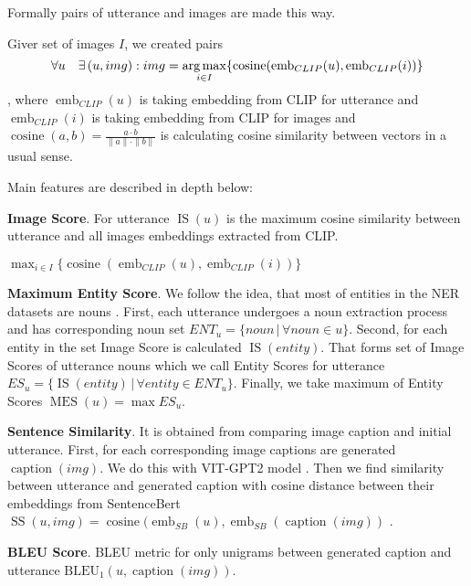 Formally pairs of utterance and images are made this way.

Giver set of images $I$, we created pairs $$\forall u \quad \exists \, (u,img): img = \displaystyle\operatorname*{arg\,max}_{i \in I} \{\operatorname{cosine}(\operatorname{emb}_{CLIP}(u), \operatorname{emb}_{CLIP}(i))\}$$, where $\operatorname{emb}_{CLIP}(u)$ is taking embedding from CLIP for utterance and $\operatorname{emb}_{CLIP}(i)$ is taking embedding from CLIP for images and $\operatorname{cosine}(a,b) = \frac{a \cdot b}{ \| a \| \cdot \| b\|}$ is calculating cosine similarity between vectors in a usual sense.

Main features are described in depth below:

\textbf{Image Score}. For utterance $\operatorname{IS}(u)$ is the maximum cosine similarity between utterance and all images embeddings extracted from CLIP. 

$\displaystyle\max_{i \in I} \{\operatorname{cosine}(\operatorname{emb}_{CLIP}(u), \operatorname{emb}_{CLIP}(i))\}$

\smallskip

\textbf{Maximum Entity Score}. We follow the idea, that most of entities in the NER datasets are nouns \cite{Noun-based}. First, each utterance undergoes a noun extraction process and has corresponding noun set $ENT_u = \{noun \, | \, \forall noun \in u \}$.  Second, for each entity in the set Image Score is calculated $\operatorname{IS}(entity)$. That forms set of Image Scores of utterance nouns which we call Entity Scores for utterance $ES_u = \{\operatorname{IS}(entity) \, | \, \forall entity \in ENT_u \}$. Finally, we take maximum of Entity Scores $\operatorname{MES}(u) = \max ES_u$.

\smallskip

\textbf{Sentence Similarity}. It is obtained from comparing image caption and initial utterance. First, for each corresponding image captions are generated $\operatorname{caption}(img)$. We do this with VIT-GPT2 model \cite{kumar2022imagecaptioning}. Then we find similarity between utterance and generated caption with cosine distance between their embeddings from SentenceBert $\operatorname{SS}(u,img) = \operatorname{cosine}(\operatorname{emb}_{SB}(u), \operatorname{emb}_{SB}(\operatorname{caption}(img))$ \cite{reimers-2019-sentence-bert} . 

\smallskip

\textbf{BLEU Score}. BLEU \cite{bleu} metric for only unigrams between generated caption and utterance $\operatorname{BLEU_1}(u, \operatorname{caption}(img))$.

